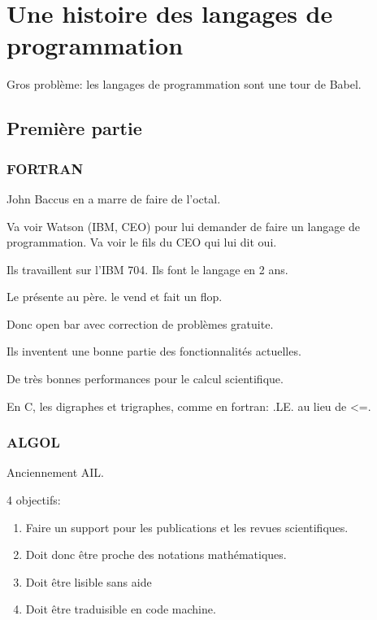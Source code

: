 \documentclass[a4paper,11pt]{article}
\begin{document}
\section{Une histoire des langages de programmation}

Gros problème: les langages de programmation sont une tour de Babel.

\subsection{Première partie}

\subsubsection{FORTRAN}

John Baccus en a marre de faire de l'octal.

Va voir Watson (IBM, CEO) pour lui demander de faire un langage de
programmation. Va voir le fils du CEO qui lui dit oui.

Ils travaillent sur l'IBM 704. Ils font le langage en 2 ans.

Le présente au père. le vend et fait un flop.

Donc open bar avec correction de problèmes gratuite.

Ils inventent une bonne partie des fonctionnalités actuelles.

De très bonnes performances pour le calcul scientifique.

En C, les digraphes et trigraphes, comme en fortran: .LE. au lieu de <=.

\subsubsection{ALGOL}

Anciennement AIL.

4 objectifs:

\begin{enumerate}

\item Faire un support pour les publications et les revues scientifiques.

\item Doit donc être proche des notations mathématiques.

\item Doit être lisible sans aide

\item Doit être traduisible en code machine.

\end{enumerate}
\end{document}
